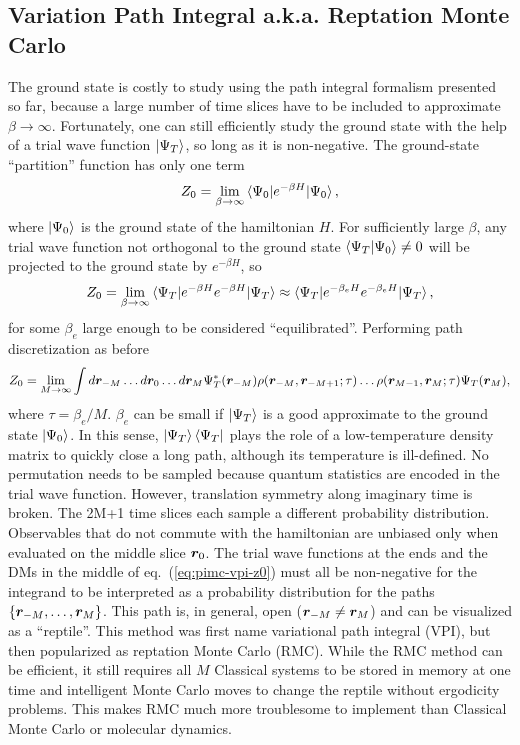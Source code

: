 \subsection{Variation Path Integral a.k.a. Reptation Monte Carlo}
The ground state is costly to study using the path integral formalism presented so far, because a large number of time slices have to be included to approximate $\beta\rightarrow\infty$. Fortunately, one can still efficiently study the ground state with the help of a trial wave function $\ket{\Psi_T}$, so long as it is non-negative. The ground-state ``partition'' function has only one term
\begin{align}
Z_0 = \lim\limits_{\beta\rightarrow\infty} \braket{\Psi_0|e^{-\beta H}|\Psi_0},
\end{align}
where $\ket{\Psi_0}$ is the ground state of the hamiltonian $H$.
For sufficiently large $\beta$, any trial wave function not orthogonal to the ground state $\braket{\Psi_T|\Psi_0}\neq0$ will be projected to the ground state by $e^{-\beta H}$, so
\begin{align} \label{eq:rmc-z0}
Z_0 = \lim\limits_{\beta\rightarrow\infty}\braket{\Psi_T|e^{-\beta H}e^{-\beta H}|\Psi_T} \approx \braket{\Psi_T|e^{-\beta_e H}e^{-\beta_e H}|\Psi_T},
\end{align}
for some $\beta_e$ large enough to be considered ``equilibrated''. Performing path discretization as before
\begin{align} \label{eq:pimc-vpi-z0}
Z_0 = \lim\limits_{M\rightarrow\infty} \int d\boldsymbol{r}_{-M}\dots d\boldsymbol{r}_0\dots d\boldsymbol{r}_{M}
\Psi_T^*(\boldsymbol{r}_{-M})\rho(\boldsymbol{r}_{-M},\boldsymbol{r}_{-M+1};\tau)\dots\rho(\boldsymbol{r}_{M-1},\boldsymbol{r}_M;\tau)\Psi_T(\boldsymbol{r}_M),
\end{align}
where $\tau=\beta_e/M$. $\beta_e$ can be small if $\ket{\Psi_T}$ is a good approximate to the ground state $\ket{\Psi_0}$. In this sense, $\ket{\Psi_T}\bra{\Psi_T}$ plays the role of a low-temperature density matrix to quickly close a long path, although its temperature is ill-defined. No permutation needs to be sampled because quantum statistics are encoded in the trial wave function. However, translation symmetry along imaginary time is broken. The 2M+1 time slices each sample a different probability distribution. Observables that do not commute with the hamiltonian are unbiased only when evaluated on the middle slice $\boldsymbol{r}_0$. The trial wave functions at the ends and the DMs in the middle of eq.~(\ref{eq:pimc-vpi-z0}) must all be non-negative for the integrand to be interpreted as a probability distribution for the paths $\{\boldsymbol{r}_{-M},\dots,\boldsymbol{r}_M\}$. This path is, in general, open ($\boldsymbol{r}_{-M}\neq\boldsymbol{r}_M$) and can be visualized as a ``reptile''. This method was first name variational path integral (VPI), but then popularized as reptation Monte Carlo (RMC). While the RMC method can be efficient, it still requires all $M$ Classical systems to be stored in memory at one time and intelligent Monte Carlo moves to change the reptile without ergodicity problems. This makes RMC much more troublesome to implement than Classical Monte Carlo or molecular dynamics.

